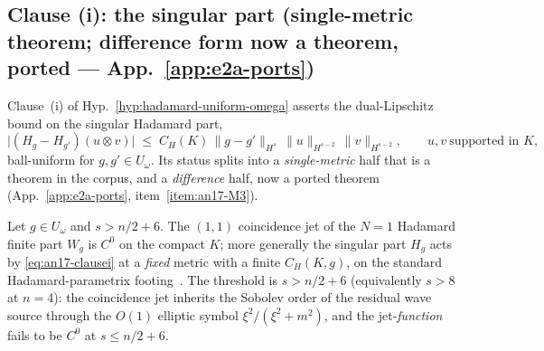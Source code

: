 
\subsection{Clause (i): the singular part (single-metric theorem;
difference form now a theorem, ported --- App.~\ref{app:e2a-ports})}
\label{sec:an17-clause-i}

Clause~(i) of Hyp.~\ref{hyp:hadamard-uniform-omega} asserts the
dual-Lipschitz bound on the singular Hadamard part,
\begin{equation}\label{eq:an17-clausei}
  \bigl|(H_g-H_{g'})(u\otimes v)\bigr|
    \;\le\; C_H(K)\,\|g-g'\|_{H^s}\,
      \|u\|_{H^{s-2}}\,\|v\|_{H^{s-2}},
  \qquad u,v\ \text{supported in }K,
\end{equation}
ball-uniform for $g,g'\in U_\omega$.  Its status splits into a
\emph{single-metric} half that is a theorem in the corpus, and a
\emph{difference} half, now a ported theorem
(App.~\ref{app:e2a-ports}, item~\ref{item:an17-M3}).

\begin{lemma}
\label{lem:an17-clausei-single}
Let $g\in U_\omega$ and $s>n/2+6$.  The $(1,1)$ coincidence jet of the
$N=1$ Hadamard finite part $W_g$ is $C^0$ on the compact $K$; more
generally the singular part $H_g$ acts by \eqref{eq:an17-clausei} at a
\emph{fixed} metric with a finite $C_H(K,g)$, on the standard
Hadamard-parametrix footing~\cite{Moretti2003,HollandsWald2015,
KayWald1991}.  The threshold is $s>n/2+6$ (equivalently $s>8$ at
$n=4$): the coincidence jet inherits the Sobolev order of the residual
wave source through the $O(1)$ elliptic symbol $\xi^2/(\xi^2+m^2)$, and
the jet-\emph{function} fails to be $C^0$ at $s\le n/2+6$.
\end{lemma}

